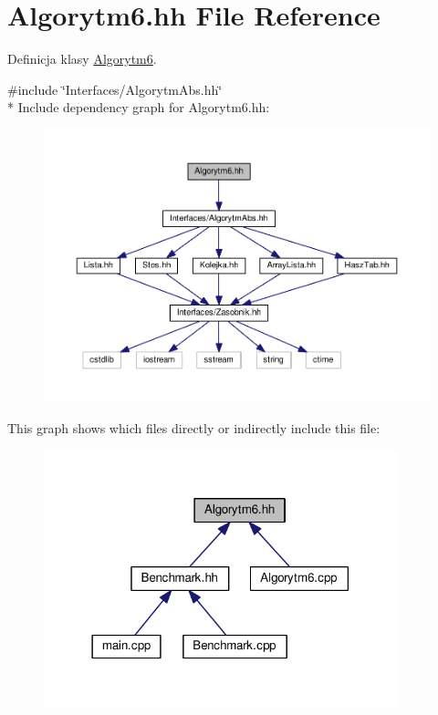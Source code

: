 \hypertarget{a00029}{}\section{Algorytm6.\+hh File Reference}
\label{a00029}


Definicja klasy \hyperlink{a00007}{Algorytm6}.  


{\ttfamily \#include \char`\"{}Interfaces/\+Algorytm\+Abs.\+hh\char`\"{}}\\*
Include dependency graph for Algorytm6.\+hh\+:
\nopagebreak
\begin{figure}[H]
\begin{center}
\leavevmode
\includegraphics[width=350pt]{a00069}
\end{center}
\end{figure}
This graph shows which files directly or indirectly include this file\+:
\nopagebreak
\begin{figure}[H]
\begin{center}
\leavevmode
\includegraphics[width=290pt]{a00070}
\end{center}
\end{figure}
